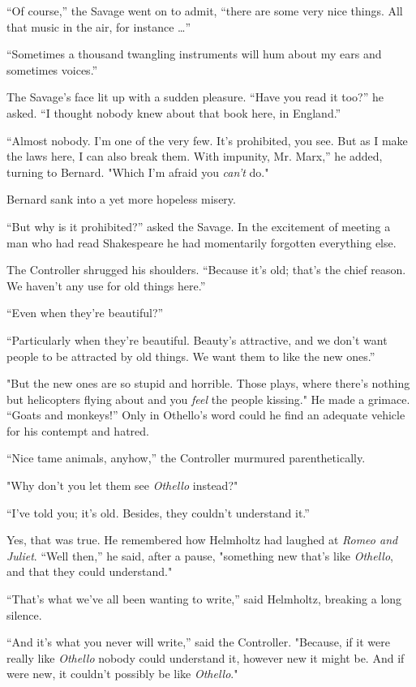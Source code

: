 \documentclass[12pt]{report}
\begin{document}
``Of course,'' the Savage went on to admit, ``there are some very nice
things. All that music in the air, for instance \ldots{}''

``Sometimes a thousand twangling instruments will hum about my ears and
sometimes voices.''

The Savage's face lit up with a sudden pleasure. ``Have you read it
too?'' he asked. ``I thought nobody knew about that book here, in
England.''

``Almost nobody. I'm one of the very few. It's prohibited, you see. But
as I make the laws here, I can also break them. With impunity, Mr.
Marx,'' he added, turning to Bernard. "Which I'm afraid you \emph{can't}
do."

Bernard sank into a yet more hopeless misery.

``But why is it prohibited?'' asked the Savage. In the excitement of
meeting a man who had read Shakespeare he had momentarily forgotten
everything else.

The Controller shrugged his shoulders. ``Because it's old; that's the
chief reason. We haven't any use for old things here.''

``Even when they're beautiful?''

``Particularly when they're beautiful. Beauty's attractive, and we don't
want people to be attracted by old things. We want them to like the new
ones.''

"But the new ones are so stupid and horrible. Those plays, where there's
nothing but helicopters flying about and you \emph{feel} the people
kissing." He made a grimace. ``Goats and monkeys!'' Only in Othello's
word could he find an adequate vehicle for his contempt and hatred.

``Nice tame animals, anyhow,'' the Controller murmured parenthetically.

"Why don't you let them see \emph{Othello} instead?"

``I've told you; it's old. Besides, they couldn't understand it.''

Yes, that was true. He remembered how Helmholtz had laughed at
\emph{Romeo and Juliet}. ``Well then,'' he said, after a pause,
"something new that's like \emph{Othello}, and that they could
understand."

``That's what we've all been wanting to write,'' said Helmholtz,
breaking a long silence.

``And it's what you never will write,'' said the Controller. "Because,
if it were really like \emph{Othello} nobody could understand it,
however new it might be. And if were new, it couldn't possibly be like
\emph{Othello}."
\end{document}
